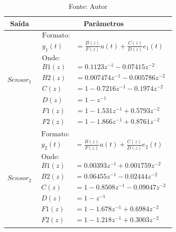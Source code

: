 \begin{table}[h]
	\centering
	\caption{Melhor modelo experimental - BJ}
	\label{tab:tclabsp-model-bj}
	\begin{tabular}{c|c} \toprule
		{Saída}			&	{Parâmetros}									\\ \midrule
		$Sensor_1$			&
								$ 
									\begin{aligned}
										\text{Formato:}														\\
										y_1(t) &= \frac{B(z)}{F(z)}u(t) + \frac{C(z)}{D(z)}e_1(t)			\\
										\text{Onde:}														\\
										B1(z) &= 0.1123 z^{-1} - 0.07415 z^{-2} 							\\
										B2(z) &= 0.007474 z^{-1} - 0.005786 z^{-2}  						\\		
										C(z) &= 1 - 0.7216 z^{-1} - 0.1974 z^{-2}  							\\	
										D(z) &= 1 - z^{-1}  												\\	
										F1(z) &= 1 - 1.531 z^{-1} + 0.5793 z^{-2}  							\\	
										F2(z) &= 1 - 1.866 z^{-1} + 0.8761 z^{-2}  
									\end{aligned}
								$	
							\\ \midrule
		$Sensor_2$			&
								$ 
									\begin{aligned}
										\text{Formato:}														\\
										y_2(t) &= \frac{B(z)}{F(z)}u(t) + \frac{C(z)}{D(z)}e_2(t)			\\
										\text{Onde:}														\\
										B1(z) &= 0.00393 z^{-1} + 0.001759 z^{-2} 							\\
										B2(z) &= 0.06455 z^{-1} - 0.02444 z^{-2}  							\\	
										C(z) &= 1 - 0.8508 z^{-1} - 0.09047 z^{-2} 							\\	
										D(z) &= 1 - z^{-1}  												\\	
										F1(z) &= 1 - 1.678 z^{-1} + 0.6984 z^{-2} 							\\	
										F2(z) &= 1 - 1.218 z^{-1} + 0.3003 z^{-2}    			
									\end{aligned}
								$
							\\ \bottomrule
	\end{tabular}
	\caption*{Fonte: Autor}
\end{table}

